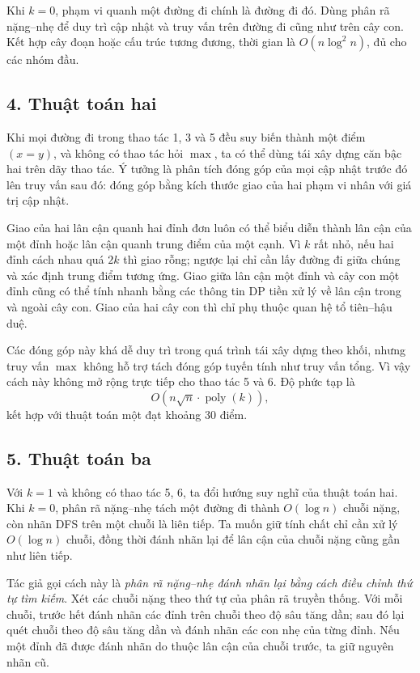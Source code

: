 \documentclass[11pt]{article}
\begin{document}
Khi \(k=0\), phạm vi quanh một đường đi chính là đường đi đó. Dùng phân rã
nặng--nhẹ để duy trì cập nhật và truy vấn trên đường đi cũng như trên cây con.
Kết hợp cây đoạn hoặc cấu trúc tương đương, thời gian là \(O(n\log^2 n)\), đủ
cho các nhóm đầu.

\subsection*{4. Thuật toán hai}

Khi mọi đường đi trong thao tác 1, 3 và 5 đều suy biến thành một điểm
\((x=y)\), và không có thao tác hỏi \(\max\), ta có thể dùng tái xây dựng căn
bậc hai trên dãy thao tác. Ý tưởng là phân tích đóng góp của mọi cập nhật trước
đó lên truy vấn sau đó: đóng góp bằng kích thước giao của hai phạm vi nhân với
giá trị cập nhật.

Giao của hai lân cận quanh hai đỉnh đơn luôn có thể biểu diễn thành lân cận
của một đỉnh hoặc lân cận quanh trung điểm của một cạnh. Vì \(k\) rất nhỏ, nếu
hai đỉnh cách nhau quá \(2k\) thì giao rỗng; ngược lại chỉ cần lấy đường đi
giữa chúng và xác định trung điểm tương ứng. Giao giữa lân cận một đỉnh và cây
con một đỉnh cũng có thể tính nhanh bằng các thông tin DP tiền xử lý về lân
cận trong và ngoài cây con. Giao của hai cây con thì chỉ phụ thuộc quan hệ tổ
tiên--hậu duệ.

Các đóng góp này khá dễ duy trì trong quá trình tái xây dựng theo khối, nhưng
truy vấn \(\max\) không hỗ trợ tách đóng góp tuyến tính như truy vấn tổng. Vì
vậy cách này không mở rộng trực tiếp cho thao tác 5 và 6. Độ phức tạp là
\[
  O(n\sqrt n\cdot \operatorname{poly}(k)),
\]
kết hợp với thuật toán một đạt khoảng 30 điểm.

\subsection*{5. Thuật toán ba}

Với \(k=1\) và không có thao tác 5, 6, ta đổi hướng suy nghĩ của thuật toán hai.
Khi \(k=0\), phân rã nặng--nhẹ tách một đường đi thành \(O(\log n)\) chuỗi
nặng, còn nhãn DFS trên một chuỗi là liên tiếp. Ta muốn giữ tính chất chỉ cần
xử lý \(O(\log n)\) chuỗi, đồng thời đánh nhãn lại để lân cận của chuỗi nặng
cũng gần như liên tiếp.

Tác giả gọi cách này là \emph{phân rã nặng--nhẹ đánh nhãn lại bằng cách điều
chỉnh thứ tự tìm kiếm}. Xét các chuỗi nặng theo thứ tự của phân rã truyền
thống. Với mỗi chuỗi, trước hết đánh nhãn các đỉnh trên chuỗi theo độ sâu tăng
dần; sau đó lại quét chuỗi theo độ sâu tăng dần và đánh nhãn các con nhẹ của
từng đỉnh. Nếu một đỉnh đã được đánh nhãn do thuộc lân cận của chuỗi trước, ta
giữ nguyên nhãn cũ.
\end{document}

